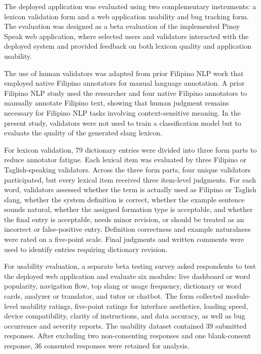 The deployed application was evaluated using two complementary instruments: a lexicon validation form and a web application usability and bug tracking form. The evaluation was designed as a beta evaluation of the implemented Pinoy Speak web application, where selected users and validators interacted with the deployed system and provided feedback on both lexicon quality and application usability.

The use of human validators was adapted from prior Filipino NLP work that employed native Filipino annotators for manual language annotation. A prior Filipino NLP study \cite{b12} used the researcher and four native Filipino annotators to manually annotate Filipino text, showing that human judgment remains necessary for Filipino NLP tasks involving context-sensitive meaning. In the present study, validators were not used to train a classification model but to evaluate the quality of the generated slang lexicon.

For lexicon validation, 79 dictionary entries were divided into three form parts to reduce annotator fatigue. Each lexical item was evaluated by three Filipino or Taglish-speaking validators. Across the three form parts, four unique validators participated, but every lexical item received three item-level judgments. For each word, validators assessed whether the term is actually used as Filipino or Taglish slang, whether the system definition is correct, whether the example sentence sounds natural, whether the assigned formation type is acceptable, and whether the final entry is acceptable, needs minor revision, or should be treated as an incorrect or false-positive entry. Definition correctness and example naturalness were rated on a five-point scale. Final judgments and written comments were used to identify entries requiring dictionary revision.

For usability evaluation, a separate beta testing survey asked respondents to test the deployed web application and evaluate six modules: live dashboard or word popularity, navigation flow, top slang or usage frequency, dictionary or word cards, analyzer or translator, and tutor or chatbot. The form collected module-level usability ratings, five-point ratings for interface aesthetics, loading speed, device compatibility, clarity of instructions, and data accuracy, as well as bug occurrence and severity reports. The usability dataset contained 39 submitted responses. After excluding two non-consenting responses and one blank-consent response, 36 consented responses were retained for analysis.

